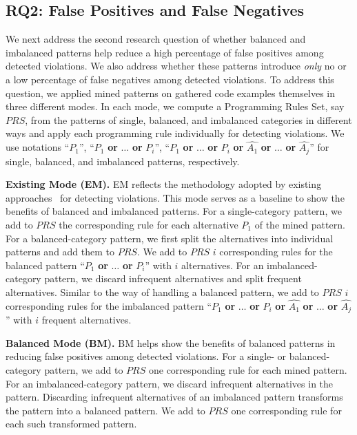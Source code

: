 \subsection{RQ2: False Positives and False Negatives}
\label{sec:defopensource}

We next address the second research question of whether balanced and imbalanced patterns help reduce a high percentage of false positives among detected violations. We also address whether these patterns introduce \emph{only} no or a low percentage of false negatives among detected violations. To address this question, we applied mined patterns on gathered code examples themselves in three different modes. In each mode, we compute a Programming Rules Set, say $PRS$, from the patterns of single, balanced, and imbalanced categories in different ways and apply each programming rule individually for detecting violations. We use notations ``$P_1$'', ``$P_1$ \textbf{or} $\ldots$ \textbf{or} $P_i$'', ``$P_1$ \textbf{or} $\ldots$ \textbf{or} $P_i$ \textbf{or} $\hat{A_1}$ \textbf{or} $\ldots$ \textbf{or} $\hat{A_j}$'' for single, balanced, and imbalanced patterns, respectively.

\textbf{Existing Mode (EM).} EM reflects the methodology adopted by existing approaches~\cite{Engler2001deviant,Zhenmin2005PRMiner,acharya06:mining} for detecting violations. This mode serves as a baseline to show the benefits of balanced and imbalanced patterns. For a single-category pattern, we add to $PRS$ the corresponding rule for each alternative $P_1$ of the mined pattern. For a balanced-category pattern, we first split the alternatives into individual patterns and add them to $PRS$. We add to $PRS$ $i$ corresponding rules for the balanced pattern ``$P_1$ \textbf{or} $\ldots$ \textbf{or} $P_i$'' with $i$ alternatives. For an imbalanced-category pattern, we discard infrequent alternatives and split frequent alternatives. Similar to the way of handling a balanced pattern, we add to $PRS$ $i$ corresponding rules for the imbalanced pattern ``$P_1$ \textbf{or} $\ldots$ \textbf{or} $P_i$ \textbf{or} $\hat{A_1}$ \textbf{or} $\ldots$ \textbf{or} $\hat{A_j}$'' with $i$ frequent alternatives.

\textbf{Balanced Mode (BM).} BM helps show the benefits of balanced patterns in reducing false positives among detected violations. For a single- or balanced-category pattern, we add to $PRS$ one corresponding rule for each mined pattern. For an imbalanced-category pattern, we discard infrequent alternatives in the pattern. Discarding infrequent alternatives of an imbalanced pattern transforms the pattern into a balanced pattern. We add to $PRS$ one corresponding rule for each such transformed pattern.

